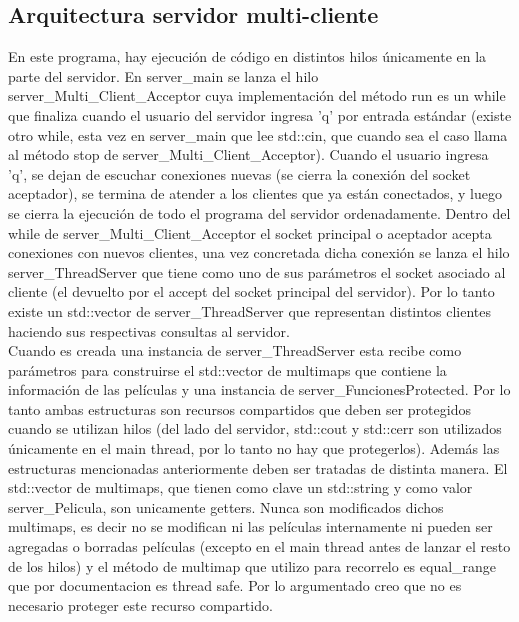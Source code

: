 \documentclass[a4paper,12pt]{report}
\begin{document}
\subsection{Arquitectura servidor multi-cliente}

En este programa, hay ejecuci\'on de c\'odigo en distintos hilos \'unicamente en la parte del servidor. En server\_main se lanza el hilo server\_Multi\_Client\_Acceptor cuya implementaci\'on del m\'etodo run es un while que finaliza cuando el usuario del servidor ingresa 'q' por entrada est\'andar (existe otro while, esta vez en server\_main que lee std::cin, que cuando sea el caso llama al m\'etodo stop de server\_Multi\_Client\_Acceptor). Cuando el usuario ingresa 'q', se dejan de escuchar conexiones nuevas (se cierra la conexi\'on del socket aceptador), se termina de atender a los clientes que ya están conectados, y luego se cierra la ejecuci\'on de todo el programa del servidor ordenadamente. Dentro del while de server\_Multi\_Client\_Acceptor el socket principal o aceptador acepta conexiones con nuevos clientes, una vez concretada dicha conexi\'on se lanza el hilo server\_ThreadServer que tiene como uno de sus par\'ametros el socket asociado al cliente (el devuelto por el accept del socket principal del servidor). Por lo tanto existe un std::vector de server\_ThreadServer que representan distintos clientes haciendo sus respectivas consultas al servidor.\\

Cuando es creada una instancia de server\_ThreadServer esta recibe como par\'ametros para construirse el std::vector de multimaps que contiene la informaci\'on de las pel\'iculas y una instancia de server\_FuncionesProtected. Por lo tanto ambas estructuras son recursos compartidos que deben ser protegidos cuando se utilizan hilos (del lado del servidor, std::cout y std::cerr son utilizados \'unicamente en el main thread, por lo tanto no hay que protegerlos). Adem\'as las estructuras mencionadas anteriormente deben ser tratadas de distinta manera. El std::vector de multimaps, que tienen como clave un std::string y como valor server\_Pelicula, son unicamente getters. Nunca son modificados dichos multimaps, es decir no se modifican ni las pel\'iculas internamente ni pueden ser agregadas o borradas pel\'iculas (excepto en el main thread antes de lanzar el resto de los hilos) y el m\'etodo de multimap que utilizo para recorrelo es equal\_range que por documentacion es thread safe. Por lo argumentado creo que no es necesario proteger este recurso compartido. \\
\end{document}
